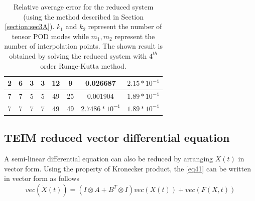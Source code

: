 \documentclass{article}
\begin{document}
\begin{table}[]
{\begin{tabular}{|c|c|c|c|c|c|c|c|}
2           & 6           & 3           & 3           & 12         & 9          & 0.026687                                                                                     & $2.15*10^{-4}$                                                                                     \\ \hline
7           & 7           & 5           & 5           & 49         & 25         & 0.001904                                                                                     & $1.89*10^{-4}$                                                                                     \\ \hline
7           & 7           & 7           & 7           & 49         & 49         & $2.7486*10^{-4}$                                                                                     & $1.89*10^{-4}$                                                                                     \\ \hline
\end{tabular}%
}
\caption{Relative average error for the reduced system (using the method described in Section \ref{section:sec3A}). $k_1$ and $k_2$ represent the number of tensor POD modes while $m_1,m_2$ represent the number of interpolation points. The shown result is obtained by solving the reduced system with $4^{th}$ order Runge-Kutta method. }
\label{tab:table6}
\end{table}



\subsection{TEIM reduced vector differential equation}\label{section:sec3B}
A semi-linear differential equation can also be reduced by arranging $X(t)$ in vector form. Using the property of Kronecker product, the \eqref{eq41} can be written in vector form as follows  
\begin{equation}\label{eq42}
    vec(\Dot{X}(t))= (I \otimes A + B^T \otimes I)vec(X(t)) +vec(F(X,t))
\end{equation}
\end{document}
